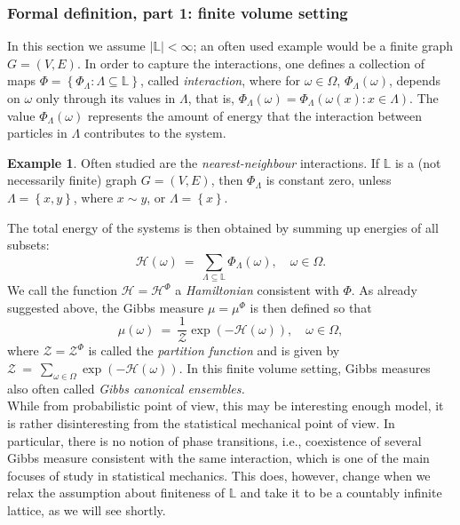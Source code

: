 \documentclass[12pt]{article}
\renewcommand{\H}{\mathcal{H}}
\renewcommand{\L}{\mathbb{L}}
\newcommand{\ZZ}{\mathcal{Z}}
\newcommand{\set}[1]{\left\{#1\right\}}
\newcommand{\1}{\mathbbm{1}}
\newcommand{\5}{\vspace{0.5cm}}
\theoremstyle{definition}
\newtheorem{ex}[thm]{Example}
\begin{document}
\subsubsection{Formal definition, part 1: finite volume setting}

In this section we assume $|\L|<\infty$; an often used example would be a finite graph $G=(V,E)$. In order to capture the interactions, one defines a collection of maps $\Phi=\set{\Phi_\Lambda:\Lambda\subseteq\L}$, called \textit{interaction}, where for $\omega\in\Omega$, $\Phi_\Lambda(\omega)$, depends on $\omega$ only through its values in $\Lambda$, that is, $\Phi_\Lambda(\omega)=\Phi_\Lambda(\omega(x)\!:\!x\in\Lambda)$. The value $\Phi_\Lambda(\omega)$ represents the amount of energy that the interaction between particles in $\Lambda$ contributes to the system.

\begin{ex}
Often studied are the \textit{nearest-neighbour} interactions. If $\L$ is a (not necessarily finite) graph $G=(V,E)$, then $\Phi_\Lambda$ is constant zero, unless $\Lambda=\set{x,y}$, where $x\sim y$, or $\Lambda=\set{x}$.
\end{ex}

The total energy of the systems is then obtained by summing up energies of all subsets:
$$\H(\omega) ~=~ \sum_{\Lambda\subseteq \L}\Phi_\Lambda(\omega), \quad \omega\in\Omega.$$
We call the function $\H=\H^\Phi$ a \textit{Hamiltonian} consistent with $\Phi$. As already suggested above, the Gibbs measure $\mu=\mu^\Phi$ is then defined so that
$$\mu(\omega) ~=~ \frac{1}{\ZZ}\exp(-\H(\omega)), \quad \omega\in\Omega,$$
where $\ZZ=\ZZ^\Phi$ is called the \textit{partition function} and is given by $\ZZ ~=~ \sum_{\omega\in\Omega}\exp(-\H(\omega)).$ In this finite volume setting, Gibbs measures also often called \textit{Gibbs canonical ensembles.} \\

While from probabilistic point of view, this may be interesting enough model, it is rather disinteresting from the statistical mechanical point of view. In particular, there is no notion of phase transitions, i.e., coexistence of several Gibbs measure consistent with the same interaction, which is one of the main focuses of study in statistical mechanics. This does, however, change when we relax the assumption about finiteness of $\L$ and take it to be a countably infinite lattice, as we will see shortly.

\end{document}
